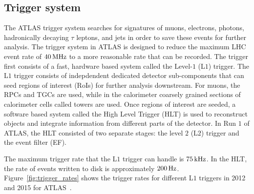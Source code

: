 \subsection{Trigger system}

The ATLAS trigger system searches for signatures of muons, electrons, photons, hadronically decaying $\tau$ leptons, and jets in order to save these events for further analysis. The trigger system in ATLAS is designed to reduce the maximum LHC event rate of $40\,\rm MHz$ to a more reasonable rate that can be recorded. The trigger first consists of a fast, hardware based system called the Level-$1$ (L$1$) trigger. The L$1$ trigger consists of indepdendent dedicated detector sub-components that can seed regions of interest (RoIs) for further analysis downstream. For muons, the RPCs and TGCs are used, while in the calorimeter coarsely grained sections of calorimeter cells called towers are used. Once regions of interest are seeded, a software based system called the High Level Trigger (HLT) is used to reconstruct objects and integrate information from different parts of the detector. In Run $1$ of ATLAS, the HLT consisted of two separate stages: the level $2$ (L$2$) trigger and the event filter (EF). 

The maximum trigger rate that the L$1$ trigger can handle is $75\,\rm kHz$. In the HLT, the rate of events written to disk is approximately $200\, \rm Hz$. Figure~\ref{fig:trigger_rates} shows the trigger rates for different L$1$ triggers in 2012 and 2015 for ATLAS~\cite{TriggerOps}. 

